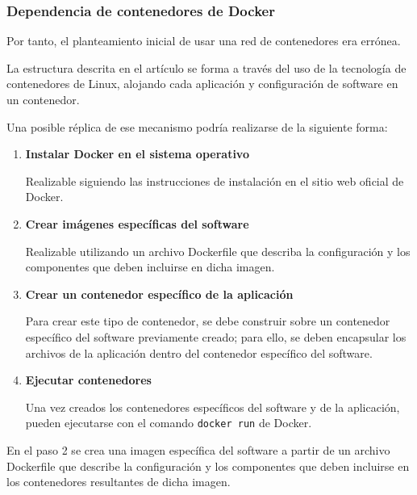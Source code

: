                 
            \subsubsection{Dependencia de contenedores de Docker}

                Por tanto, el planteamiento inicial de usar una red de contenedores era errónea.
                
                La estructura descrita en el artículo se forma a través del uso de la tecnología de contenedores de Linux, alojando cada aplicación y configuración de software en un contenedor.

                Una posible réplica de ese mecanismo podría realizarse de la siguiente forma:

                \begin{enumerate}

                    \item \textbf{Instalar Docker en el sistema operativo}
                    
                    Realizable siguiendo las instrucciones de instalación en el sitio web oficial de Docker.
                
                    \item \textbf{Crear imágenes específicas del software}
                    
                    Realizable utilizando un archivo Dockerfile que describa la configuración y los componentes que deben incluirse en dicha imagen.

                    \item \textbf{Crear un contenedor específico de la aplicación}

                    Para crear este tipo de contenedor, se debe construir sobre un contenedor específico del software previamente creado; para ello, se deben encapsular los archivos de la aplicación dentro del contenedor específico del software.

                    \item \textbf{Ejecutar contenedores}
                    
                    Una vez creados los contenedores específicos del software y de la aplicación, pueden ejecutarse con el comando \texttt{docker run} de Docker.

                \end{enumerate}

                En el paso 2 se crea una imagen específica del software a partir de un archivo Dockerfile que describe la configuración y los componentes que deben incluirse en los contenedores resultantes de dicha imagen.

